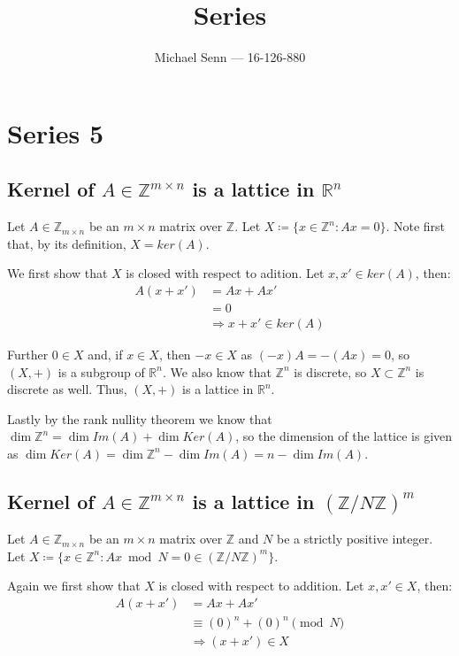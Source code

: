 \documentclass[a4paper]{scrreprt}
\title{Series \series}
\author{Michael Senn \maillink{michael.senn@students.unibe.ch} --- 16-126-880}
\date{\printdate}
\newcommand{\series}{5}
\begin{document}
\maketitle


\setcounter{chapter}{\numexpr \series - 1 \relax}

\chapter{Series \series}

\section{Kernel of $A \in \mathbb{Z}^{m \times n}$ is a lattice in $\mathbb{R}^n$}

Let $A \in \mathbb{Z}_{m \times n}$ be an $m \times n$ matrix over
$\mathbb{Z}$. Let $X \coloneqq \{x \in \mathbb{Z}^n : Ax = 0\}$. Note first
that, by its definition, $X = ker(A)$.

We first show that $X$ is closed with respect to adition. Let $x, x' \in
ker(A)$, then:
\begin{align*}
		A(x + x') & = Ax + Ax' \\
				  & = 0 \\
				  & \Rightarrow x + x' \in ker(A)
\end{align*}

Further $0 \in X$ and, if $x \in X$, then $-x \in X$ as $(-x)A = -(Ax) = 0$, so
$(X, +)$ is a subgroup of $\mathbb{R}^n$. We also know that $\mathbb{Z}^n$ is
discrete, so $X \subset \mathbb{Z}^n$ is discrete as well. Thus, $(X, +)$ is a
lattice in $\mathbb{R}^n$.

Lastly by the rank nullity theorem we know that $\dim \mathbb{Z}^n = \dim Im(A)
+ \dim Ker(A)$, so the dimension of the lattice is given as $\dim Ker(A) = \dim
\mathbb{Z}^n - \dim Im(A) = n - \dim Im(A)$.

\section{Kernel of $A \in \mathbb{Z}^{m \times n}$ is a lattice in $(\mathbb{Z} / N\mathbb{Z})^m$}

Let $A \in \mathbb{Z}_{m \times n}$ be an $m \times n$ matrix over $\mathbb{Z}$
and $N$ be a strictly positive integer. Let $X \coloneqq \{x \in \mathbb{Z}^n :
Ax \bmod N = 0 \in (\mathbb{Z}/N\mathbb{Z})^m \}$.

Again we first show that $X$ is closed with respect to addition. Let $x, x' \in
X$, then:
\begin{align*}
		A(x + x') & = Ax + Ax' \\
				  & \equiv (0)^n + (0)^n \pmod{N} \\
				  & \Rightarrow (x + x') \in X
\end{align*}
\end{document}
